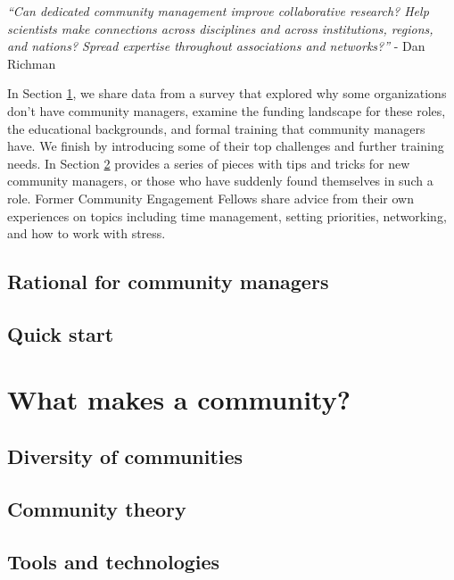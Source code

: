 \documentclass[]{book}
\begin{document}
\emph{``Can dedicated community management improve collaborative research? Help scientists make connections across disciplines and across institutions, regions, and nations? Spread expertise throughout associations and networks?''} - Dan Richman

In Section \ref{rationalCM}, we share data from a survey that explored why some organizations don't have community managers, examine the funding landscape for these roles, the educational backgrounds, and formal training that community managers have. We finish by introducing some of their top challenges and further training needs. In Section \ref{quickstart} provides a series of pieces with tips and tricks for new community managers, or those who have suddenly found themselves in such a role. Former Community Engagement Fellows share advice from their own experiences on topics including time management, setting priorities, networking, and how to work with stress.

\hypertarget{rationalCM}{%
\section{Rational for community managers}\label{rationalCM}}

\hypertarget{quickstart}{%
\section{Quick start}\label{quickstart}}

\hypertarget{what-makes-a-community}{%
\chapter{What makes a community?}\label{what-makes-a-community}}

\hypertarget{diversity-of-communities}{%
\section{Diversity of communities}\label{diversity-of-communities}}

\hypertarget{community-theory}{%
\section{Community theory}\label{community-theory}}

\hypertarget{tools-and-technologies}{%
\section{Tools and technologies}\label{tools-and-technologies}}
\end{document}
